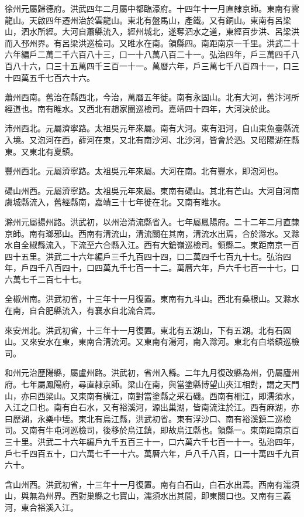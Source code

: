 徐州元屬歸德府。洪武四年二月屬中都臨濠府。十四年十一月直隸京師。東南有雲龍山。天啟四年遷州治於雲龍山。東北有盤馬山，產鐵。又有銅山。東南有呂梁山，泗水所經。大河自蕭縣流入，經州城北，遂奪泗水之道，東經百步洪、呂梁洪而入邳州界。有呂梁洪巡檢司。又睢水在南。領縣四。南距南京一千里。洪武二十六年編戶二萬二千六百八十三，口一十八萬八百二十一。弘治四年，戶三萬四千八百八十六，口三十五萬四千三百一十一。萬曆六年，戶三萬七千八百四十一，口三十四萬五千七百六十六。

蕭州西南。舊治在縣西北，今治，萬曆五年徙。南有永固山。北有大河，舊汴河所經道也。南有睢水。又西北有趙家圈巡檢司。嘉靖四十四年，大河決於此。

沛州西北。元屬濟寧路。太祖吳元年來屬。南有大河。東有泗河，自山東魚臺縣流入境。又泡河在西，薛河在東，又北有南沙河、北沙河，皆會於泗。又昭陽湖在縣東。又東北有夏鎮。

豐州西北。元屬濟寧路。太祖吳元年來屬。大河在南。北有豐水，即泡河也。

碭山州西。元屬濟寧路。太祖吳元年來屬。東南有碭山。其北有芒山。大河自河南虞城縣流入，舊經縣南，嘉靖三十七年徙在北。又南有睢水。

滁州元屬揚州路。洪武初，以州治清流縣省入。七年屬鳳陽府。二十二年二月直隸京師。南有瑯邪山。西南有清流山，清流關在其南，清流水出焉，合於滁水。又滁水自全椒縣流入，下流至六合縣入江。西有大鎗嶺巡檢司。領縣二。東距南京一百四十五里。洪武二十六年編戶三千九百四十四，口二萬四千七百九十七。弘治四年，戶四千八百四十，口四萬九千七百一十二。萬曆六年，戶六千七百一十七，口六萬七千二百七十七。

全椒州南。洪武初省，十三年十一月復置。東南有九斗山。西北有桑根山。又滁水在南，自合肥縣流入，有襄水自北流合焉。

來安州北。洪武初省，十三年十一月復置。東北有五湖山，下有五湖。北有石固山。又來安水在東，東南合清流河。又東南有湯河，南入滁河。東北有白塔鎮巡檢司。

和州元治歷陽縣，屬盧州路。洪武初，省州入縣。二年九月復改縣為州，仍屬廬州府。七年屬鳳陽府，尋直隸京師。梁山在南，與當塗縣博望山夾江相對，謂之天門山，亦曰西梁山。又東南有橫江，南對當塗縣之采石磯。西南有柵江，即濡須水，入江之口也。南有白石水，又有裕溪河，源出巢湖，皆南流注於江。西有麻湖，亦曰歷湖，永樂中堙。東北有烏江縣，洪武初省。東有浮沙口、南有裕溪鎮二巡檢司。又南有牛屯河巡檢司，後移於烏江鎮，即故烏江縣也。領縣一。東南距南京百三十里。洪武二十六年編戶九千五百三十一，口六萬六千七百一十一。弘治四年，戶七千四百五十，口六萬七千一十六。萬曆六年，戶八千八百，口一十萬四千九百六十。

含山州西。洪武初省，十三年十一月復置。南有白石山，白石水出焉。西南有濡須山，與無為州界。西對巢縣之七寶山，濡須水出其間，即東關口也。又南有三義河，東合裕溪入江。

